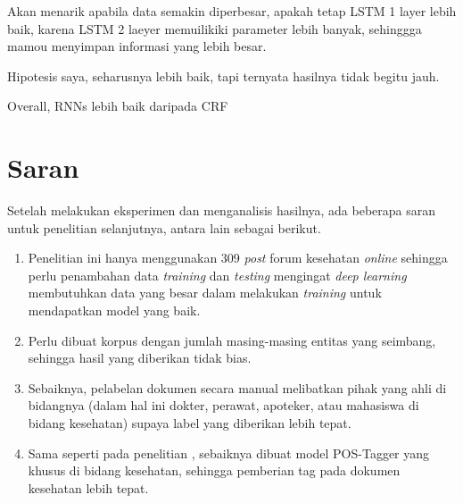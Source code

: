 Akan menarik apabila data semakin diperbesar, apakah tetap LSTM 1 layer lebih baik, karena LSTM 2 laeyer memuilikiki parameter lebih banyak, sehinggga mamou menyimpan informasi yang lebih besar.

Hipotesis saya, seharusnya lebih baik, tapi ternyata hasilnya tidak begitu jauh.

Overall, RNNs lebih baik daripada CRF

\section{Saran}
Setelah melakukan eksperimen dan menganalisis hasilnya, ada beberapa saran untuk penelitian selanjutnya, antara lain sebagai berikut.

\begin{enumerate}
  \item Penelitian ini hanya menggunakan 309 \textit{post} forum kesehatan \textit{online} sehingga perlu penambahan data \textit{training} dan \textit{testing} mengingat \textit{deep learning} membutuhkan data yang besar dalam melakukan \textit{training} untuk mendapatkan model yang baik.

  \item Perlu dibuat korpus dengan jumlah masing-masing entitas yang seimbang, sehingga hasil yang diberikan tidak bias.
  
  \item Sebaiknya, pelabelan dokumen secara manual melibatkan pihak yang ahli di bidangnya (dalam hal ini dokter, perawat, apoteker, atau mahasiswa di bidang kesehatan) supaya label yang diberikan lebih tepat.
  
  \item Sama seperti pada penelitian \cite{skripsiKakRadit}, sebaiknya dibuat model POS-Tagger yang khusus di bidang kesehatan, sehingga pemberian tag pada dokumen kesehatan lebih tepat.

\end{enumerate}